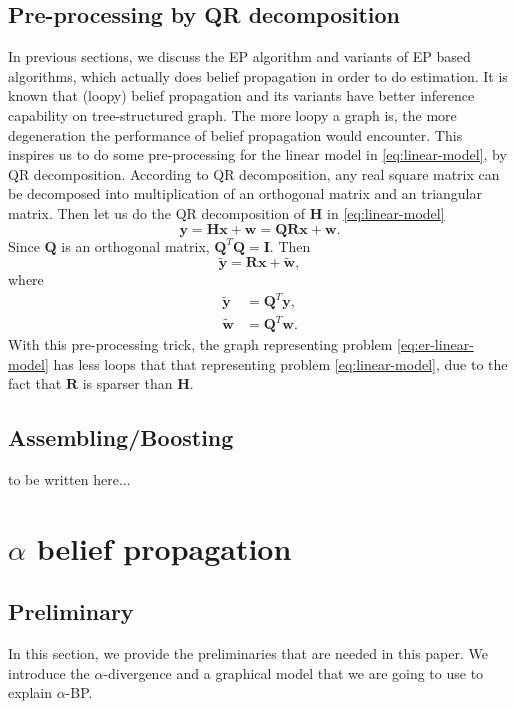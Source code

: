 \documentclass{article}
\begin{document}
\subsection{Pre-processing by QR decomposition}
In previous sections, we discuss the EP algorithm and variants of EP based algorithms, which actually does belief propagation in order to do estimation. It is known that (loopy) belief propagation and its variants have better inference capability on tree-structured graph. The more loopy a graph is, the more degeneration the performance of belief propagation would encounter.
This inspires us to do some pre-processing for the linear model in \eqref{eq:linear-model}, by QR decomposition. According to QR decomposition, any real square matrix can be decomposed into multiplication of an orthogonal matrix and an triangular matrix. Then let us do the QR decomposition of $\bm{H}$ in \eqref{eq:linear-model}
\begin{equation}
  \bm{y} = \bm{H}\bm{x} + \bm{w} = \bm{Q} \bm{R} \bm{x} + \bm{w}.
\end{equation}
Since $\bm{Q}$ is an orthogonal matrix, $\bm{Q}^{T} \bm{Q} = \bm{I}$. Then
\begin{equation}\label{eq:er-linear-model}
  \tilde{\bm{y}} =  \bm{R} \bm{x} + \tilde{\bm{w}},
\end{equation}
where
\begin{align}
  \tilde{\bm{y}} &= \bm{Q}^{T} \bm{y}, \\
  \tilde{\bm{w}} &= \bm{Q}^{T} \bm{w}.
\end{align}
With this pre-processing trick, the graph representing problem \eqref{eq:er-linear-model} has less loops that that representing problem \eqref{eq:linear-model}, due to the fact that $\bm{R}$ is sparser than $\bm{H}$.


\subsection{Assembling/Boosting}\label{subsec:assemble}
to be written here...

\section{$\alpha$ belief propagation}\label{sec:alphabp}
\subsection{Preliminary}\label{sec:preliminary}
In this section, we provide the preliminaries that are needed in this paper. We introduce the $\alpha$-divergence and a graphical model that we are going to use to explain $\alpha$-BP.
\end{document}
